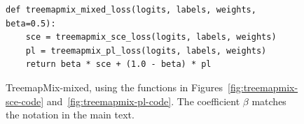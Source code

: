 \begin{figure}[!htbp]
\centering
\footnotesize
\begin{verbatim}
def treemapmix_mixed_loss(logits, labels, weights, beta=0.5):
    sce = treemapmix_sce_loss(logits, labels, weights)
    pl = treemapmix_pl_loss(logits, labels, weights)
    return beta * sce + (1.0 - beta) * pl
\end{verbatim}
\caption{TreemapMix-mixed, using the functions in Figures~\ref{fig:treemapmix-sce-code} and~\ref{fig:treemapmix-pl-code}. The coefficient $\beta$ matches the notation in the main text.}
\label{fig:treemapmix-mixed-code}
\end{figure}
